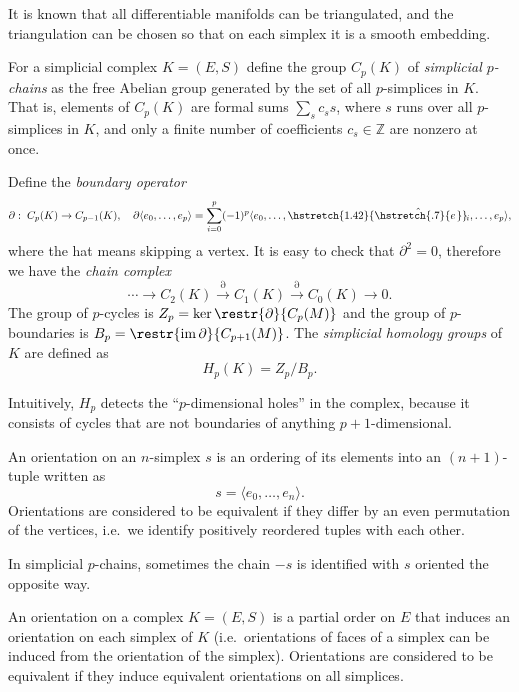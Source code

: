 \documentclass[english,letterpaper]{article}%
\numberwithin{equation}{section}
\numberwithin{figure}{section}
\numberwithin{table}{section}
\theoremstyle{definition}
\theoremstyle{definition}
\theoremstyle{definition}
\theoremstyle{plain}
\theoremstyle{plain}
\theoremstyle{plain}
\theoremstyle{plain}
\theoremstyle{remark}
\theoremstyle{remark}
\newcommand{\bbZ}{\mathbb{Z}}
\DeclareMathOperator{\im}{im}
\newcommand\wh[1]{\hstretch{1.42}{\hat{\hstretch{.7}{#1\mkern2mu}}}\mkern-2mu} %
\begin{document}
It is known that all differentiable manifolds can be triangulated, and the triangulation can be chosen so that on each simplex it is a smooth embedding.

\begin{defn}
    For a simplicial complex $K=(E,S)$ define the group $C_p(K)$ of \emph{simplicial $p$-chains} as the free Abelian group generated by the set of all $p$-simplices in $K$. That is, elements of $C_p(K)$ are formal sums $\sum_{s} c_s s$, where $s$ runs over all $p$-simplices in $K$, and only a finite number of coefficients $c_s\in \bbZ$ are nonzero at once.
    
    Define the \emph{boundary operator}
    \[\partial:\; C_p(K)\to C_{p-1}(K),\quad \partial\langle e_0,\ldots,e_p\rangle=\sum_{i=0}^p(-1)^p\langle e_0,\ldots,\wh{e}_i,\ldots,e_p\rangle,\]
    where the hat means skipping a vertex. It is easy to check that $\partial^2=0$, therefore we have the \emph{chain complex}
    \[\cdots\to C_2(K)\overset\partial\to C_1(K)\overset\partial\to C_0(K)\to 0.\]
    The group of $p$-cycles is $Z_p=\ker \restr{\partial}{C_p(M)}$ and the group of $p$-boundaries is $B_p=\restr{\im\partial}{C_{p+1}(M)}$. The \emph{simplicial homology groups} of $K$ are defined as
    \[H_p(K)=Z_p/B_p.\]
\end{defn}

Intuitively, $H_p$ detects the ``$p$-dimensional holes'' in the complex, because it consists of cycles that are not boundaries of anything $p+1$-dimensional.

\begin{defn}
    An orientation on an $n$-simplex $s$ is an ordering of its elements into an $(n+1)$-tuple written as \[s=\langle e_0,\ldots,e_n\rangle.\]
    Orientations are considered to be equivalent if they differ by an even permutation of the vertices, i.e.\ we identify positively reordered tuples with each other. 
    
    In simplicial $p$-chains, sometimes the chain $-s$ is identified with $s$ oriented the opposite way.
    
    An orientation on a complex $K=(E,S)$ is a partial order on $E$ that induces an orientation on each simplex of $K$ (i.e.\ orientations of faces of a simplex can be induced from the orientation of the simplex). Orientations are considered to be equivalent if they induce equivalent orientations on all simplices.
\end{defn}
\end{document}
